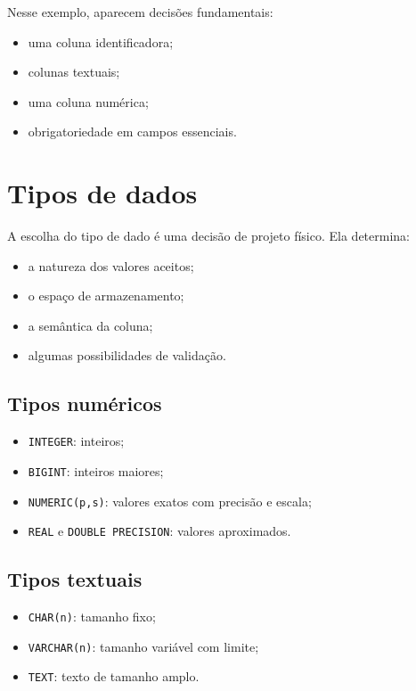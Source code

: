 Nesse exemplo, aparecem decisões fundamentais:
\begin{itemize}
    \item uma coluna identificadora;
    \item colunas textuais;
    \item uma coluna numérica;
    \item obrigatoriedade em campos essenciais.
\end{itemize}

\section{Tipos de dados}

A escolha do tipo de dado é uma decisão de projeto físico. Ela determina:
\begin{itemize}
    \item a natureza dos valores aceitos;
    \item o espaço de armazenamento;
    \item a semântica da coluna;
    \item algumas possibilidades de validação.
\end{itemize}

\subsection{Tipos numéricos}

\begin{itemize}
    \item \texttt{INTEGER}: inteiros;
    \item \texttt{BIGINT}: inteiros maiores;
    \item \texttt{NUMERIC(p,s)}: valores exatos com precisão e escala;
    \item \texttt{REAL} e \texttt{DOUBLE PRECISION}: valores aproximados.
\end{itemize}

\subsection{Tipos textuais}

\begin{itemize}
    \item \texttt{CHAR(n)}: tamanho fixo;
    \item \texttt{VARCHAR(n)}: tamanho variável com limite;
    \item \texttt{TEXT}: texto de tamanho amplo.
\end{itemize}

